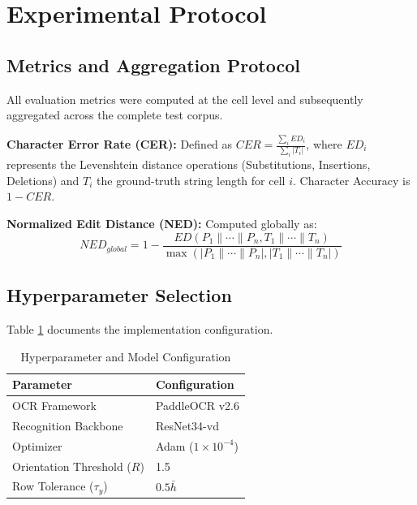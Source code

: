 \documentclass[pdflatex,sn-mathphys-num]{sn-jnl}
\begin{document}

\section{Experimental Protocol}
\label{sec:experiments}

\subsection{Metrics and Aggregation Protocol}
All evaluation metrics were computed at the cell level and subsequently aggregated across the complete test corpus. 

\textbf{Character Error Rate (CER):} Defined as $CER = \frac{\sum_i ED_i}{\sum_i |T_i|}$, where $ED_i$ represents the Levenshtein distance operations (Substitutions, Insertions, Deletions) and $T_i$ the ground-truth string length for cell $i$. Character Accuracy is $1 - CER$.

\textbf{Normalized Edit Distance (NED):} Computed globally as:
\begin{equation}
NED_{global} = 1 - \frac{ED(P_1\|\cdots\|P_n, T_1\|\cdots\|T_n)}{\max(|P_1\|\cdots\|P_n|, |T_1\|\cdots\|T_n|)}
\end{equation}

\subsection{Hyperparameter Selection}
Table \ref{tab:hyperparams} documents the implementation configuration.

\begin{table}[htbp]
\centering
\caption{Hyperparameter and Model Configuration}
\label{tab:hyperparams}
\begin{tabular}{ll}
\toprule
\textbf{Parameter} & \textbf{Configuration} \\
\midrule
OCR Framework & PaddleOCR v2.6 \\
Recognition Backbone & ResNet34-vd \\
Optimizer & Adam ($1\times10^{-4}$) \\
Orientation Threshold ($R$) & 1.5 \\
Row Tolerance ($\tau_y$) & $0.5\bar{h}$ \\
\bottomrule
\end{tabular}
\end{table}
\end{document}

